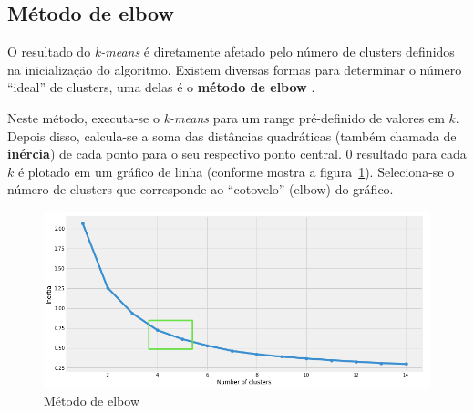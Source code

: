  
 \subsection{Método de elbow}\label{ssec:elbow}
 O resultado do \emph{k-means} é diretamente afetado pelo número de clusters definidos na inicialização do algoritmo.
 Existem diversas formas para determinar o número ``ideal'' de clusters, uma delas é o \textbf{método de elbow} \cite{Humaira}.
 
 Neste método, executa-se o \emph{k-means} para um range pré-definido de valores em $k$. 
 Depois disso, calcula-se a soma das distâncias quadráticas (também chamada de \textbf{inércia}) de cada ponto para o seu respectivo ponto central.
 0 resultado para cada $k$ é plotado em um gráfico de linha (conforme mostra a figura~\ref{fig:elbow}).
 Seleciona-se o número de clusters que corresponde ao ``cotovelo'' (elbow) do gráfico.
 
\begin{figure}[H]
   \centering
   \includegraphics[scale=0.40]{figs/elbowex.png}
    \caption{Método de elbow}
    \label{fig:elbow}
\end{figure}

 
 


